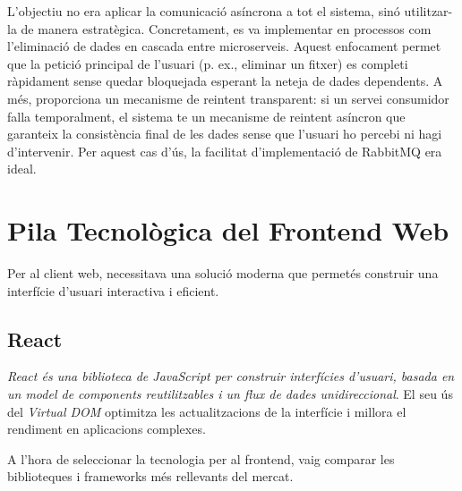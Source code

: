 L'objectiu no era aplicar la comunicació asíncrona a tot el sistema, sinó utilitzar-la de manera estratègica. Concretament, es va implementar en processos com l'eliminació de dades en cascada entre microserveis. Aquest enfocament permet que la petició principal de l'usuari (p. ex., eliminar un fitxer) es completi ràpidament sense quedar bloquejada esperant la neteja de dades dependents. A més, proporciona un mecanisme de reintent transparent: si un servei consumidor falla temporalment, el sistema te un mecanisme de reintent asíncron que garanteix la consistència final de les dades sense que l'usuari ho percebi ni hagi d'intervenir. Per aquest cas d'ús, la facilitat d'implementació de RabbitMQ era ideal.

\section{Pila Tecnològica del Frontend Web}
Per al client web, necessitava una solució moderna que permetés construir una interfície d'usuari interactiva i eficient.

\subsection{React}
\textit{React és una biblioteca de JavaScript per construir interfícies d'usuari, basada en un model de components reutilitzables i un flux de dades unidireccional}. El seu ús del \textit{Virtual DOM} optimitza les actualitzacions de la interfície i millora el rendiment en aplicacions complexes.

A l'hora de seleccionar la tecnologia per al frontend, vaig comparar les biblioteques i frameworks més rellevants del mercat.

